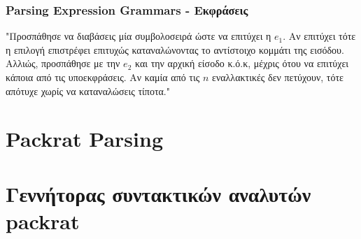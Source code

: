 \documentclass{beamer}
\begin{document}
\begin{frame}
  \frametitle{Parsing Expression Grammars - Εκφράσεις}
 \begin{description}[font=$\bullet$\scshape\bfseries]
   \item[Διατεταγμένη Επιλογή `$(e_1 / e_2 / \ldots / e_n)$':] "Προσπάθησε να διαβάσεις μία συμβολοσειρά ώστε να επιτύχει η $e_1$. 
	 Αν επιτύχει τότε η επιλογή επιστρέφει επιτυχώς καταναλώνοντας το αντίστοιχο κομμάτι της εισόδου.
	 Αλλιώς, προσπάθησε με την $e_2$ και την αρχική είσοδο κ.ό.κ, μέχρις ότου να επιτύχει κάποια από τις υποεκφράσεις.	 Αν καμία από τις $n$ εναλλακτικές δεν πετύχουν, τότε απότυχε χωρίς να καταναλώσεις τίποτα."
  \end{description}

\end{frame}

\begin{frame}
  \frametitle{}
\end{frame}

\section{Packrat Parsing}

\begin{frame}
  \frametitle{}
\end{frame}

\begin{frame}
  \frametitle{}
\end{frame}

\begin{frame}
  \frametitle{}
\end{frame}

\begin{frame}
  \frametitle{}
\end{frame}

\section{Γεννήτορας συντακτικών αναλυτών packrat}

\begin{frame}
  \frametitle{}
\end{frame}

\begin{frame}
  \frametitle{}
\end{frame}

\begin{frame}
  \frametitle{}
\end{frame}
\end{document}
